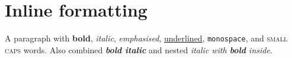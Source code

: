 \documentclass{article}
\begin{document}
\section{Inline formatting}
A paragraph with \textbf{bold}, \textit{italic}, \emph{emphasised}, \underline{underlined}, \texttt{monospace}, and \textsc{small caps} words.
Also combined \textbf{\textit{bold italic}} and nested \textit{italic with \textbf{bold} inside}.
\end{document}
